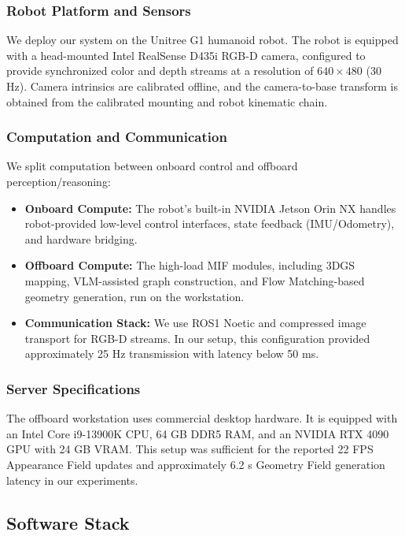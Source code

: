 \documentclass[conference]{IEEEtran}
\begin{document}
\subsubsection{Robot Platform and Sensors}
We deploy our system on the Unitree G1 humanoid robot. The robot is equipped with a head-mounted Intel RealSense D435i RGB-D camera, configured to provide synchronized color and depth streams at a resolution of $640 \times 480$ (30 Hz). Camera intrinsics are calibrated offline, and the camera-to-base transform is obtained from the calibrated mounting and robot kinematic chain.

\subsubsection{Computation and Communication}
We split computation between onboard control and offboard perception/reasoning:

\begin{itemize}
    \item \textbf{Onboard Compute:} The robot's built-in NVIDIA Jetson Orin NX handles robot-provided low-level control interfaces, state feedback (IMU/Odometry), and hardware bridging.
    \item \textbf{Offboard Compute:} The high-load MIF modules, including 3DGS mapping, VLM-assisted graph construction, and Flow Matching-based geometry generation, run on the workstation.
    \item \textbf{Communication Stack:} We use ROS1 Noetic and compressed image transport for RGB-D streams. In our setup, this configuration provided approximately 25 Hz transmission with latency below 50 ms.
\end{itemize}

\subsubsection{Server Specifications}
The offboard workstation uses commercial desktop hardware. It is equipped with an Intel Core i9-13900K CPU, 64 GB DDR5 RAM, and an NVIDIA RTX 4090 GPU with 24 GB VRAM. This setup was sufficient for the reported 22 FPS Appearance Field updates and approximately 6.2 s Geometry Field generation latency in our experiments.

\subsection{Software Stack}
\end{document}
